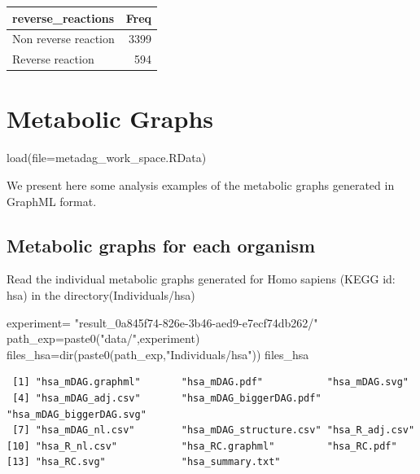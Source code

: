 \documentclass[
  letterpaper,
  DIV=11,
  numbers=noendperiod]{scrreprt}
\newenvironment{Shaded}{}{}
\newcommand{\AttributeTok}[1]{\textcolor[rgb]{0.78,0.47,0.87}{#1}}
\newcommand{\FunctionTok}[1]{\textcolor[rgb]{0.38,0.69,0.94}{#1}}
\newcommand{\NormalTok}[1]{\textcolor[rgb]{0.67,0.70,0.75}{#1}}
\newcommand{\OtherTok}[1]{\textcolor[rgb]{0.15,0.68,0.38}{#1}}
\newcommand{\StringTok}[1]{\textcolor[rgb]{0.60,0.76,0.47}{#1}}
\begin{document}
\begin{tabular}{l|r}
\hline
reverse\_reactions & Freq\\
\hline
Non reverse reaction & 3399\\
\hline
Reverse reaction & 594\\
\hline
\end{tabular}


\hypertarget{metabolic-graphs}{%
\chapter{Metabolic Graphs}\label{metabolic-graphs}}

\begin{Shaded}
\begin{Highlighting}[]
\FunctionTok{load}\NormalTok{(}\AttributeTok{file=}\StringTok{\textquotesingle{}metadag\_work\_space.RData\textquotesingle{}}\NormalTok{)}
\end{Highlighting}
\end{Shaded}

We present here some analysis examples of the metabolic graphs generated
in GraphML format.

\hypertarget{metabolic-graphs-for-each-organism}{%
\section{Metabolic graphs for each
organism}\label{metabolic-graphs-for-each-organism}}

Read the individual metabolic graphs generated for Homo sapiens (KEGG
id: hsa) in the directory(Individuals/hsa)

\begin{Shaded}
\begin{Highlighting}[]
\NormalTok{experiment}\OtherTok{=}
  \StringTok{"result\_0a845f74{-}826e{-}3b46{-}aed9{-}e7ecf74db262/"}
\NormalTok{path\_exp}\OtherTok{=}\FunctionTok{paste0}\NormalTok{(}\StringTok{"data/"}\NormalTok{,experiment)}
\NormalTok{files\_hsa}\OtherTok{=}\FunctionTok{dir}\NormalTok{(}\FunctionTok{paste0}\NormalTok{(path\_exp,}\StringTok{"Individuals/hsa"}\NormalTok{))}
\NormalTok{files\_hsa}
\end{Highlighting}
\end{Shaded}

\begin{verbatim}
 [1] "hsa_mDAG.graphml"       "hsa_mDAG.pdf"           "hsa_mDAG.svg"          
 [4] "hsa_mDAG_adj.csv"       "hsa_mDAG_biggerDAG.pdf" "hsa_mDAG_biggerDAG.svg"
 [7] "hsa_mDAG_nl.csv"        "hsa_mDAG_structure.csv" "hsa_R_adj.csv"         
[10] "hsa_R_nl.csv"           "hsa_RC.graphml"         "hsa_RC.pdf"            
[13] "hsa_RC.svg"             "hsa_summary.txt"       
\end{verbatim}
\end{document}
